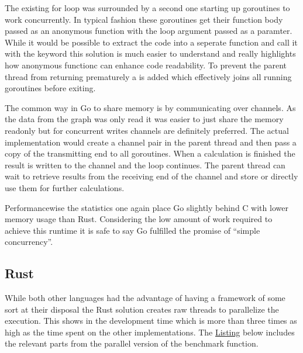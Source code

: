 The existing for loop was surrounded by a second one starting up \glspl{goroutine} to work concurrently. In typical fashion these \glspl{goroutine} get their function body passed as an anonymous function with the loop argument passed as a paramter. While it would be possible to extract the code into a seperate function and call it with the  keyword this solution is much easier to understand and really highlights how anonymous functionc can enhance code readability. To prevent the parent thread from returning prematurely a  is added which effectively joins all running \glspl{goroutine} before exiting.

The common way in Go to share memory is by communicating over channels. As the data from the graph was only read it was easier to just share the memory readonly but for concurrent writes channels are definitely preferred. The actual implementation would create a channel pair in the parent thread and then pass a copy of the transmitting end to all \glspl{goroutine}. When a calculation is finished the result is written to the channel and the loop continues. The parent thread can wait to retrieve results from the receiving end of the channel and store or directly use them for further calculations.

Performancewise the statistics one again place Go slightly behind C with lower memory usage than Rust. Considering the low amount of work required to achieve this runtime it is safe to say Go fulfilled the promise of ``simple concurrency''.

\subsection{Rust}
\label{subsec:Implementation::ParallelBenchmark::Rust}

While both other languages had the advantage of having a framework of some sort at their disposal the Rust solution creates raw threads to parallelize the execution. This shows in the development time which is more than three times as high as the time spent on the other implementations. The \hyperref[lst:concurrency.rs]{Listing} below includes the relevant parts from the parallel version of the benchmark function.
\\


